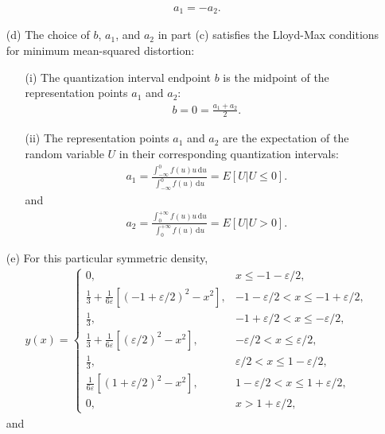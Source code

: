 \documentclass{assignment}
\begin{document}
\begin{sol}
\begin{itemize}
\begin{align}
            a_1=-a_2.
        \end{align}
        \item[(d)] The choice of $b$, $a_1$, and $a_2$ in part (c) satisfies the Lloyd-Max conditions for minimum mean-squared distortion:
        \begin{itemize}
            \item[(i)] The quantization interval endpoint $b$ is the midpoint of the representation points $a_1$ and $a_2$:
            \begin{align}
                b=0=\frac{a_1+a_2}{2}.
            \end{align}
            \item[(ii)] The representation points $a_1$ and $a_2$ are the expectation of the random variable $U$ in their corresponding quantization intervals:
            \begin{align}
                a_1=\frac{\int_{-\infty}^0f(u)u\,\mathrm{d}u}{\int_{-\infty}^0f(u)\,\mathrm{d}u}=E[U\vert U\leq 0].
            \end{align}
            and
            \begin{align}
                a_2=\frac{\int_0^{+\infty}f(u)u\,\mathrm{d}u}{\int_0^{+\infty}f(u)\,\mathrm{d}u}=E[U\vert U>0].
            \end{align}
        \end{itemize}
        \item[(e)] For this particular symmetric density,
        \begin{align}
            y(x)=\left\{\begin{array}{ll}
                0,&x\leq-1-\varepsilon/2,\\
                \frac{1}{3}+\frac{1}{6\varepsilon}[(-1+\varepsilon/2)^2-x^2],&-1-\varepsilon/2<x\leq-1+\varepsilon/2,\\
                \frac{1}{3},&-1+\varepsilon/2<x\leq-\varepsilon/2,\\
                \frac{1}{3}+\frac{1}{6\varepsilon}[(\varepsilon/2)^2-x^2],&-\varepsilon/2<x\leq\varepsilon/2,\\
                \frac{1}{3},&\varepsilon/2<x\leq 1-\varepsilon/2,\\
                \frac{1}{6\varepsilon}[(1+\varepsilon/2)^2-x^2],&1-\varepsilon/2<x\leq 1+\varepsilon/2,\\
                0,&x>1+\varepsilon/2,
            \end{array}\right.
        \end{align}
        and

\end{itemize}
\end{sol}
\end{document}
